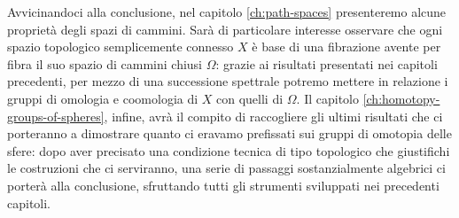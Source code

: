 Avvicinandoci alla conclusione, nel capitolo \ref{ch:path-spaces} presenteremo alcune proprietà degli spazi di cammini. Sarà di particolare interesse osservare che ogni spazio topologico semplicemente connesso $X$ è base di una fibrazione avente per fibra il suo spazio di cammini chiusi $\Omega$: grazie ai risultati presentati nei capitoli precedenti, per mezzo di una successione spettrale potremo mettere in relazione i gruppi di omologia e coomologia di $X$ con quelli di $\Omega$. Il capitolo \ref{ch:homotopy-groups-of-spheres}, infine, avrà il compito di raccogliere gli ultimi risultati che ci porteranno a dimostrare quanto ci eravamo prefissati sui gruppi di omotopia delle sfere: dopo aver precisato una condizione tecnica di tipo topologico che giustifichi le costruzioni che ci serviranno, una serie di passaggi sostanzialmente algebrici ci porterà alla conclusione, sfruttando tutti gli strumenti sviluppati nei precedenti capitoli.

